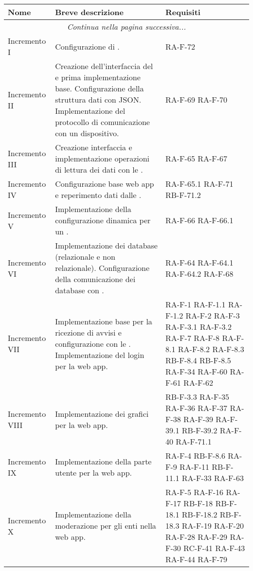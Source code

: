 \newpage
\begin{center}
	\begin{longtable}{|p{2.5cm}|p{6.5cm}|p{6cm}|}
	\hline
	\rowcolor{lighter-grayer}
	\textbf{Nome} & \textbf{Breve descrizione} & \textbf{Requisiti} \\
	\hline
	\endfirsthead
	\hline
    \multicolumn{3}{|c|}{\textit{Continua nella pagina successiva...}}\\
    \hline
    \endfoot
    \endlastfoot

	Incremento I	& Configurazione di \glock{Apache Kafka}. & RA-F-72 \\	\hline
	Incremento II & Creazione dell'interfaccia del \glock{gateway} e prima implementazione base. Configurazione della struttura dati con JSON. Implementazione del protocollo di comunicazione con un dispositivo. & RA-F-69 RA-F-70 \\	\hline
	Incremento III	& Creazione interfaccia \glock{API} e implementazione operazioni di lettura dei dati con le \glock{API}. & RA-F-65 RA-F-67 \\	\hline
	Incremento IV & Configurazione base web app e reperimento dati dalle \glock{API}. & RA-F-65.1 RA-F-71 RB-F-71.2 \\	\hline
	Incremento V	& Implementazione della configurazione dinamica per un \glock{gateway}. & RA-F-66 RA-F-66.1 \\	\hline
	Incremento VI & Implementazione dei database (relazionale e non relazionale). Configurazione della comunicazione dei database con \glock{Kafka}. & RA-F-64 RA-F-64.1 RA-F-64.2 RA-F-68 \\	\hline
	Incremento VII	& Implementazione base \glock{bot Telegram} per la ricezione di avvisi e configurazione con le \glock{API}. Implementazione del login per la web app. & RA-F-1 RA-F-1.1 RA-F-1.2 RA-F-2 RA-F-3 RA-F-3.1 RA-F-3.2 RA-F-7 RA-F-8 RA-F-8.1 RA-F-8.2 RA-F-8.3 RB-F-8.4 RB-F-8.5 RA-F-34 RA-F-60 RA-F-61 RA-F-62 \\	\hline
	Incremento VIII	& Implementazione dei grafici per la web app. &  RB-F-3.3 RA-F-35 RA-F-36 RA-F-37 RA-F-38 RA-F-39 RA-F-39.1 RB-F-39.2 RA-F-40 RA-F-71.1 \\	\hline
	Incremento IX	& Implementazione della parte utente per la web app. & RA-F-4 RB-F-8.6 RA-F-9 RA-F-11 RB-F-11.1 RA-F-33 RA-F-63 \\	\hline
	Incremento X	& Implementazione della moderazione per gli enti nella web app. & RA-F-5 RA-F-16 RA-F-17 RB-F-18 RB-F-18.1 RB-F-18.2 RB-F-18.3 RA-F-19 RA-F-20 RA-F-28 RA-F-29 RA-F-30  RC-F-41 RA-F-43 RA-F-44  RA-F-79 \\	\hline

\end{longtable}
\end{center}
